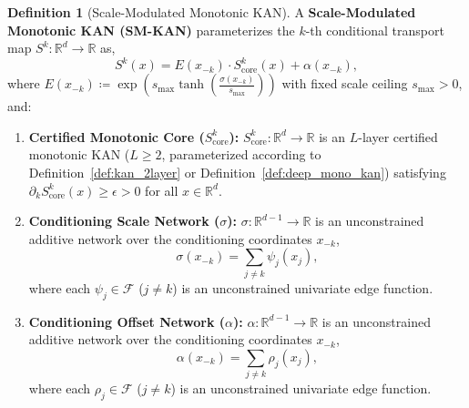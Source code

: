 \documentclass[11pt,a4paper]{article}
\theoremstyle{plain}
\theoremstyle{definition}
\newtheorem{definition}[theorem]{Definition}
\theoremstyle{remark}
\begin{document}
\begin{definition}[Scale-Modulated Monotonic KAN]
\label{def:sm_kan}
A \textbf{Scale-Modulated Monotonic KAN (SM-KAN)} parameterizes the $k$-th conditional transport map $S^k: \mathbb{R}^d \to \mathbb{R}$ as,
\begin{equation}
    S^k(x) = E(x_{-k}) \cdot S^k_{\text{core}}(x) + \alpha(x_{-k}),
    \label{eq:sm_kan_def}
\end{equation}
where $E(x_{-k}) \coloneqq \exp\left( s_{\max} \tanh\left( \frac{\sigma(x_{-k})}{s_{\max}} \right) \right)$ with fixed scale ceiling $s_{\max} > 0$, and:
\begin{enumerate}
    \item \textbf{Certified Monotonic Core ($S^k_{\text{core}}$):} $S^k_{\text{core}}: \mathbb{R}^d \to \mathbb{R}$ is an $L$-layer certified monotonic KAN ($L \ge 2$, parameterized according to Definition~\ref{def:kan_2layer} or Definition~\ref{def:deep_mono_kan}) satisfying $\partial_k S^k_{\text{core}}(x) \ge \epsilon > 0$ for all $x \in \mathbb{R}^d$.
    \item \textbf{Conditioning Scale Network ($\sigma$):} $\sigma: \mathbb{R}^{d-1} \to \mathbb{R}$ is an unconstrained additive network over the conditioning coordinates $x_{-k}$,
    \begin{equation}
        \sigma(x_{-k}) = \sum_{j \neq k} \psi_j(x_j),
        \label{eq:sm_kan_sigma}
    \end{equation}
    where each $\psi_j \in \mathcal{F}$ ($j \neq k$) is an unconstrained univariate edge function.
    \item \textbf{Conditioning Offset Network ($\alpha$):} $\alpha: \mathbb{R}^{d-1} \to \mathbb{R}$ is an unconstrained additive network over the conditioning coordinates $x_{-k}$,
    \begin{equation}
        \alpha(x_{-k}) = \sum_{j \neq k} \rho_j(x_j),
        \label{eq:sm_kan_alpha}
    \end{equation}
    where each $\rho_j \in \mathcal{F}$ ($j \neq k$) is an unconstrained univariate edge function.
\end{enumerate}
\end{definition}
\end{document}
